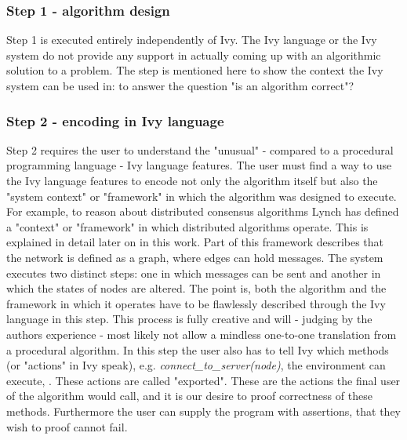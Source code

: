 \documentclass[fleqn]{article}
\begin{document}
\subsubsection{Step 1 - algorithm design}
Step 1 is executed entirely independently of Ivy. The Ivy language or the Ivy system do not provide any support in actually coming up with an algorithmic solution to a problem.
The step is mentioned here to show the context the Ivy system can be used in: to answer the question "is an algorithm correct"?

\subsubsection{Step 2 - encoding in Ivy language}
Step 2 requires the user to understand the "unusual" \cite{refLanguageDoc} - compared to a procedural programming language -  Ivy language features. The user must
find a way to use the Ivy language features to encode not only the algorithm itself but also the "system context" or "framework" in which the algorithm was designed to execute.
For example, to reason about distributed consensus algorithms Lynch has defined a "context" or "framework" in which distributed algorithms operate.
This is explained in detail later on in this work. Part of this framework describes that the network is defined as a graph, where edges can hold messages.
The system executes two distinct steps: one in which messages can be sent and another in which the states of nodes are altered.
The point is, both the algorithm and the framework in which it operates have to be flawlessly described through the Ivy language in this step. This process is
fully creative and will - judging by the authors experience - most likely not allow a mindless one-to-one translation from a procedural algorithm.
In this step the user also has to tell Ivy which methods (or "actions" in Ivy speak), e.g. \textit{connect\_to\_server(node)}, the environment can execute, . These actions are called "exported".
These are the actions the final user of the algorithm would call, and it is our desire to proof correctness of these methods. Furthermore the user can supply
the program with assertions, that they wish to proof cannot fail.
\end{document}
